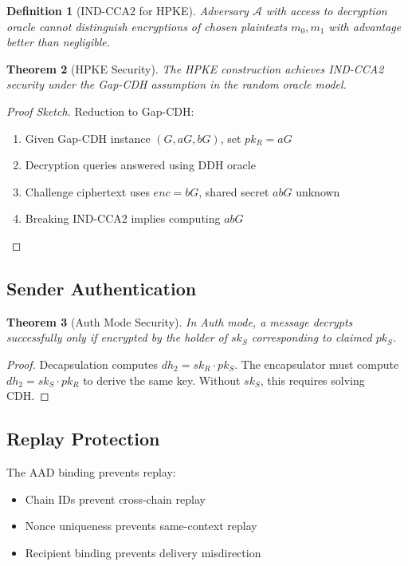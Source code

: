 \documentclass[11pt,a4paper]{article}
\newtheorem{theorem}{Theorem}[section]
\newtheorem{definition}[theorem]{Definition}
\begin{document}
\begin{definition}[IND-CCA2 for HPKE]
Adversary $\mathcal{A}$ with access to decryption oracle cannot distinguish encryptions of chosen plaintexts $m_0, m_1$ with advantage better than negligible.
\end{definition}

\begin{theorem}[HPKE Security]
The HPKE construction achieves IND-CCA2 security under the Gap-CDH assumption in the random oracle model.
\end{theorem}

\begin{proof}[Proof Sketch]
Reduction to Gap-CDH:
\begin{enumerate}
    \item Given Gap-CDH instance $(G, aG, bG)$, set $pk_R = aG$
    \item Decryption queries answered using DDH oracle
    \item Challenge ciphertext uses $enc = bG$, shared secret $abG$ unknown
    \item Breaking IND-CCA2 implies computing $abG$
\end{enumerate}
\end{proof}

\subsection{Sender Authentication}

\begin{theorem}[Auth Mode Security]
In Auth mode, a message decrypts successfully only if encrypted by the holder of $sk_S$ corresponding to claimed $pk_S$.
\end{theorem}

\begin{proof}
Decapsulation computes $dh_2 = sk_R \cdot pk_S$. The encapsulator must compute $dh_2 = sk_S \cdot pk_R$ to derive the same key. Without $sk_S$, this requires solving CDH.
\end{proof}

\subsection{Replay Protection}

The AAD binding prevents replay:
\begin{itemize}
    \item Chain IDs prevent cross-chain replay
    \item Nonce uniqueness prevents same-context replay
    \item Recipient binding prevents delivery misdirection
\end{itemize}
\end{document}
